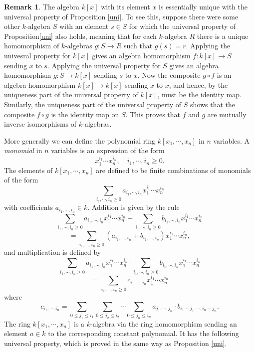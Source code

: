 \documentclass [12pt,oneside,a4paper,mathscr]{amsart}
\theoremstyle{definition}
\newtheorem{remark}[thm]{Remark}
\renewcommand{\leq}{\leqslant}
\renewcommand{\geq}{\geqslant}
\begin{document}
\begin{remark}
\label{unirem}
The algebra $k[x]$ with its element $x$ is essentially unique with the universal property of Proposition \ref{uni}. To see this, suppose there were some other $k$-algebra $S$ with an element $s\in S$ for which the universal property of Proposition\ref{uni} also holds, meaning that for each $k$-algebra $R$ there is a unique homomorphism of $k$-algebras $g\colon S\to R$ such that $g(s)=r$. Applying the univesral property for $k[x]$ gives an algebra homomorphism $f\colon k[x]\to S$ sending $x$ to $s$. Applying the universal property  for $S$ gives an algebra homomorphism $g\colon S \to k[x]$ sending $s$ to $x$. Now the composite $g\circ f$ is an algebra homomorphism $k[x]\to k[x]$ sending $x$ to $x$, and hence, by the uniqueness part of the universal property of $k[x]$, must be the identity map. Similarly, the  uniqueness part of the universal property of $S$ shows that the composite $f\circ g$ is the identity map on $S$. This proves  that $f$ and $g$ are mutually inverse isomorphisms of $k$-algebras.
\end{remark}

More generally we can define the polynomial ring $k[x_1,\cdots ,x_n]$ in $n$ variables.
A \emph{monomial} in $n$ variables is an expression of the form
\[x_1^{i_1} \cdots x_n^{i_n}, \quad  i_1,\cdots, i_n \geq 0.\] 
The elements of $k[x_1,\cdots,x_n]$ are defined to be finite combinations of monomials of the form
\[\sum_{i_1,\cdots, i_n\geq 0} a_{i_1,\cdots, i_n} x_1^{i_1} \cdots x_n^{i_n} \]
with coefficients $ a_{i_1,\cdots, i_n} \in k.$
Addition is given by the rule
\[\sum _{i_1,\cdots, i_n \geq 0} a_{i_1,\cdots, i_n} x_1^{i_1} \cdots x_n^{i_n} + \sum _{i_1,\cdots, i_n \geq 0} b_{i_1,\cdots, i_n} x_1^{i_1} \cdots x_n^{i_n} \]\[=  \sum _{i_1,\cdots, i_n \geq 0}(a_{i_1,\cdots, i_n} + b_{i_1,\cdots, i_n}) x_1^{i_1} \cdots x_n^{i_n},\]
and multiplication is defined by
\[\sum _{i_1,\cdots, i_n \geq 0} a_{i_1,\cdots, i_n} x_1^{i_1} \cdots x_n^{i_n} \cdot  \sum _{i_1,\cdots, i_n \geq 0} b_{i_1,\cdots, i_n} x_1^{i_1} \cdots x_n^{i_n}\]\[=\sum_{i_1,\cdots,i_n\geq 0} c_{i_1,\cdots,i_n} x_1^{i_1}\cdots x_n^{i_n}\]
where
\[c_{i_1, \cdots , i_n}= \sum_{0\leq j_1 \leq i_1} \sum_{0\leq j_2\leq i_2} \cdots \sum_{0\leq j_n\leq i_n} a_{j_1,\cdots,j_n}\cdot b_{i_1-j_1,\cdots, i_n-j_n}.\]
The ring $k[x_1,\cdots,x_n]$ is a $k$-algebra via the ring homomorphism sending an element $a\in k$ to the corresponding constant polynomial. It has the following universal property, which is proved in the same way as Proposition \ref{uni}.
\end{document}
